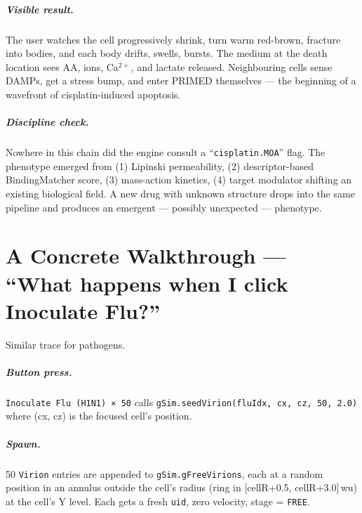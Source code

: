 \documentclass[11pt,letterpaper,twoside,openany]{book}
\newcommand{\code}[1]{\texttt{#1}}
\begin{document}
\paragraph{Visible result.} The user watches the cell progressively
shrink, turn warm red-brown, fracture into bodies, and each body
drifts, swells, bursts. The medium at the death location sees AA,
ions, Ca$^{2+}$, and lactate released. Neighbouring cells sense
DAMPs, get a stress bump, and enter PRIMED themselves --- the
beginning of a wavefront of cisplatin-induced apoptosis.

\paragraph{Discipline check.} Nowhere in this chain did the engine
consult a ``\code{cisplatin.MOA}'' flag. The phenotype emerged from
(1) Lipinski permeability, (2) descriptor-based BindingMatcher
score, (3) mass-action kinetics, (4) target modulator shifting an
existing biological field. A new drug with unknown structure drops
into the same pipeline and produces an emergent --- possibly
unexpected --- phenotype.

\chapter{A Concrete Walkthrough --- ``What happens when I click Inoculate Flu?''}
\label{ch:walkthrough-infection}

Similar trace for pathogens.

\paragraph{Button press.} \code{Inoculate Flu (H1N1) × 50} calls
\code{gSim.seedVirion(fluIdx, cx, cz, 50, 2.0)} where (cx, cz) is
the focused cell's position.

\paragraph{Spawn.} 50 \code{Virion} entries are appended to
\code{gSim.gFreeVirions}, each at a random position in an annulus
outside the cell's radius (ring in [cellR+0.5, cellR+3.0]\,wu) at
the cell's Y level. Each gets a fresh \code{uid}, zero velocity,
stage = \code{FREE}.
\end{document}
